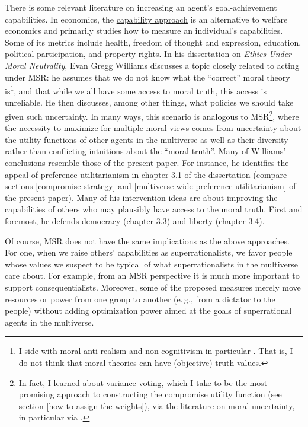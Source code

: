 There is some relevant literature on increasing an agent's
goal-achievement capabilities. In economics, the
\href{https://en.wikipedia.org/wiki/Capability_approach}{capability
approach} is an alternative to welfare economics and primarily studies
how to measure an individual's capabilities. Some of its metrics include
health, freedom of thought and expression, education, political
participation, and property rights. In his dissertation on \emph{Ethics
Under Moral Neutrality}, Evan
Gregg Williams \citeyear{Williams2011-ul} discusses a topic closely related to acting
under MSR: he assumes that we do not know what the ``correct'' moral
theory is\footnote{\label{non-cognitivism} I side with moral anti-realism
  \parencite{Joyce2016-no} and
  \href{https://en.wikipedia.org/wiki/Non-cognitivism}{non-cognitivism}
  in particular \parencite[section 3]{Joyce2016-no}. That is, I do not
  think that moral theories can have (objective) truth values.}, and
that while we all have some access to moral truth, this access is
unreliable. He then discusses,
among other things, what policies we should take given such uncertainty.
In many ways, this scenario is analogous to MSR\footnote{In fact, I
  learned about variance voting, which I take to be the most promising
  approach to constructing the compromise utility function (see section
  \ref{how-to-assign-the-weights}), via the literature on moral uncertainty, in
  particular via \citet[chapter 3]{MacAskill2014-ca}.}, where the
necessity to maximize for multiple moral views comes from uncertainty
about the utility functions of other agents in the multiverse as well as
their diversity rather than conflicting intuitions about the ``moral
truth''. Many of Williams' conclusions resemble those of the present
paper. For instance, he identifies the appeal of preference
utilitarianism in chapter 3.1 of the dissertation (compare sections \ref{compromise-strategy} and \ref{multiverse-wide-preference-utilitarianism} of the present paper). 
Many of his
intervention ideas are about improving the capabilities of others who
may plausibly have access to the moral truth. First and foremost, he
defends democracy (chapter 3.3) and liberty (chapter 3.4).

Of course, MSR does not have the same implications as the above
approaches. For one, when we raise others' capabilities as
superrationalists, we favor people whose values we suspect to be typical
of what superrationalists in the multiverse care about. For example,
from an MSR perspective it is much more important to support
consequentialists. Moreover, some of the proposed measures merely move
resources or power from one group to another (e.\,g., from a dictator to
the people) without adding optimization power aimed at the goals of
superrational agents in the multiverse.

